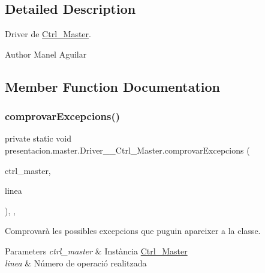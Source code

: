 \subsection{Detailed Description}
Driver de \hyperlink{classpresentacion_1_1master_1_1Ctrl__Master}{Ctrl\+\_\+\+Master}. 

\begin{DoxyAuthor}{Author}
Manel Aguilar 
\end{DoxyAuthor}


\subsection{Member Function Documentation}
\mbox{\label{classpresentacion_1_1master_1_1Driver____Ctrl__Master_ae522ded3194d6be2aa68cc60b7590716}} 
\subsubsection{\texorpdfstring{comprovar\+Excepcions()}{comprovarExcepcions()}}
{\footnotesize\ttfamily private static void presentacion.\+master.\+Driver\+\_\+\+\_\+\+Ctrl\+\_\+\+Master.\+comprovar\+Excepcions (\begin{DoxyParamCaption}\item[{\hyperlink{classpresentacion_1_1master_1_1Ctrl__Master}{Ctrl\+\_\+\+Master}}]{ctrl\+\_\+master,  }\item[{String}]{linea }\end{DoxyParamCaption})\hspace{0.3cm}{\ttfamily [inline]}, {\ttfamily [static]}, {\ttfamily [private]}}



Comprovarà les possibles excepcions que puguin apareixer a la classe. 


\begin{DoxyParams}{Parameters}
{\em ctrl\+\_\+master} & Instància \hyperlink{classpresentacion_1_1master_1_1Ctrl__Master}{Ctrl\+\_\+\+Master} \\
\hline
{\em linea} & Número de operació realitzada \\
\hline
\end{DoxyParams}
\mbox{\label{classpresentacion_1_1master_1_1Driver____Ctrl__Master_a4965d356e9bd0a56c753c3a2d296b7cc}} 

